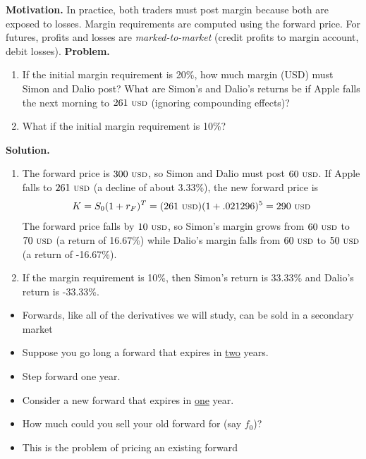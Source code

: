 \documentclass{beamer}
\begin{document}
\begin{frame}{}
	\textbf{Motivation.} In practice, both traders must post margin because both are exposed to losses. Margin requirements are computed using the forward price. For futures, profits and losses are \textit{marked-to-market} (credit profits to margin account, debit losses).
	\vfill
	\textbf{Problem.} 
	\begin{enumerate}
		\item If the initial margin requirement is 20\%, how much margin (USD) must Simon and Dalio post? What are Simon's and Dalio's returns be if Apple falls the next morning to $261\text{ {\scriptsize USD}}$ (ignoring compounding effects)?
		\item What if the initial margin requirement is 10\%?
	\end{enumerate}
\end{frame}

\begin{frame}{}
	\textbf{Solution.} 
	\begin{enumerate}
		\item The forward price is $300\text{ {\scriptsize USD}}$, so Simon and Dalio must post $60\text{ {\scriptsize USD}}$. If Apple falls to $261\text{ {\scriptsize USD}}$ (a decline of about 3.33\%), the new forward price is
		\begin{equation}
			K=S_{0}(1+r_{F})^{T}=(261\text{ {\scriptsize USD}})(1+.021296)^{5}=290\text{ {\scriptsize USD}}
		\end{equation}
			The forward price falls by $10\text{ {\scriptsize USD}}$, so Simon's margin grows from $60\text{ {\scriptsize USD}}$ to $70\text{ {\scriptsize USD}}$ (a return of 16.67\%) while Dalio's margin falls from $60\text{ {\scriptsize USD}}$ to $50\text{ {\scriptsize USD}}$ (a return of -16.67\%). 
		\item If the margin requirement is 10\%, then Simon's return is 33.33\% and Dalio's return is -33.33\%.  
	\end{enumerate}
\end{frame}

\begin{frame}{}
   \begin{itemize}
	   \item Forwards, like all of the derivatives we will study, can be sold in a secondary market
       \item Suppose you go long a forward that expires in \underline{two} years.
       \item Step forward one year. 
       \item Consider a new forward that expires in \underline{one} year.
       \item How much could you sell your old forward for (say $f_{0}$)? 
	   \item This is the problem of pricing an existing forward
   \end{itemize}
\end{frame}
\end{document}
